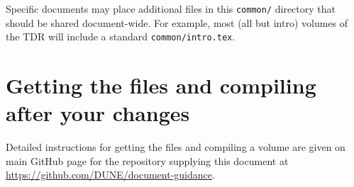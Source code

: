 Specific documents may place additional files in this \texttt{common/}
directory that should be shared document-wide.
For example, most (all but intro) volumes of the TDR will include a standard \texttt{common/intro.tex}.

\section{Getting the files and compiling after your changes}
\label{sec:tech-compile}

Detailed instructions for getting the files and compiling a volume are
given on main GitHub page for the repository supplying this document at
\url{https://github.com/DUNE/document-guidance}.
  
